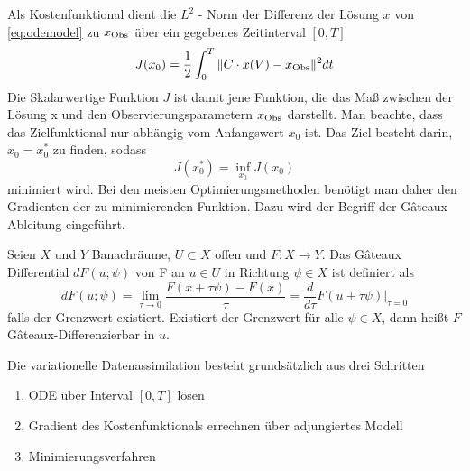 Als Kostenfunktional dient die $L^2$ - Norm der Differenz der Lösung $x$ von \eqref{eq:odemodel} zu $x_{\text{Obs}}$ über ein gegebenes Zeitinterval $[0,T]$
\begin{equation}
 J(x_0) = \frac{1}{2}\int_0^T \|C\cdot x(V)-x_{\text{Obs}}\|^2dt
\end{equation}
Die Skalarwertige Funktion $J$ ist damit jene Funktion, die das Maß zwischen der Lösung x und den Observierungsparametern $x_{\text{Obs}}$ darstellt.
Man beachte, dass das Zielfunktional nur abhängig vom Anfangswert $x_0$ ist. Das Ziel besteht darin, $x_0 = x_0^*$ zu finden, sodass
\[
 J(x_0^*) = \inf_{x_0} J(x_0) 
\]
minimiert wird. Bei den meisten Optimierungsmethoden benötigt man daher den Gradienten der zu minimierenden Funktion. Dazu wird der Begriff der Gâteaux Ableitung eingeführt.
\begin{definition}
 Seien $X$ und $Y$ Banachräume, $U \subset X$ offen und $F:X\to Y$. Das Gâteaux Differential $dF(u;\psi)$ von F an $u\in U$ in Richtung $\psi\in X$ ist definiert als
 \[
  dF(u;\psi) = \lim_{\tau \to 0} \frac{F(x+\tau \psi) - F(x)}{\tau} = \frac{d}{d\tau} F(u+\tau\psi)\biggr\rvert_{\tau = 0}
 \]
 falls der Grenzwert existiert. Existiert der Grenzwert für alle $\psi\in X$, dann heißt $F$ Gâteaux-Differenzierbar in $u$.
\end{definition}




Die variationelle Datenassimilation besteht grundsätzlich aus drei Schritten
\begin{enumerate}
 \item ODE über Interval $[0,T]$ lösen
 \item Gradient des Kostenfunktionals errechnen über adjungiertes Modell
 \item Minimierungsverfahren 
\end{enumerate}